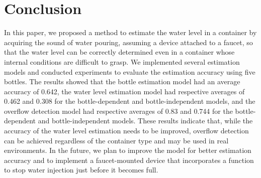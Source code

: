\documentclass[manuscript,screen,anonymous,review]{acmart}
\begin{document}
\section{Conclusion}
\label{sec:conclution}
In this paper, we proposed a method to estimate the water level in a container by acquiring the sound of water pouring, assuming a device attached to a faucet, so that the water level can be correctly determined even in a container whose internal conditions are difficult to grasp. We implemented several estimation models and conducted experiments to evaluate the estimation accuracy using five bottles. The results showed that the bottle estimation model had an average accuracy of 0.642, the water level estimation model had respective averages of 0.462 and 0.308 for the bottle-dependent and bottle-independent models, and the overflow detection model had respective averages of 0.83 and 0.744 for the bottle-dependent and bottle-independent models. These results indicate that, while the accuracy of the water level estimation needs to be improved, overflow detection can be achieved regardless of the container type and may be used in real environments. In the future, we plan to improve the model for better estimation accuracy and to implement a faucet-mounted device that incorporates a function to stop water injection just before it becomes full.







\end{document}

